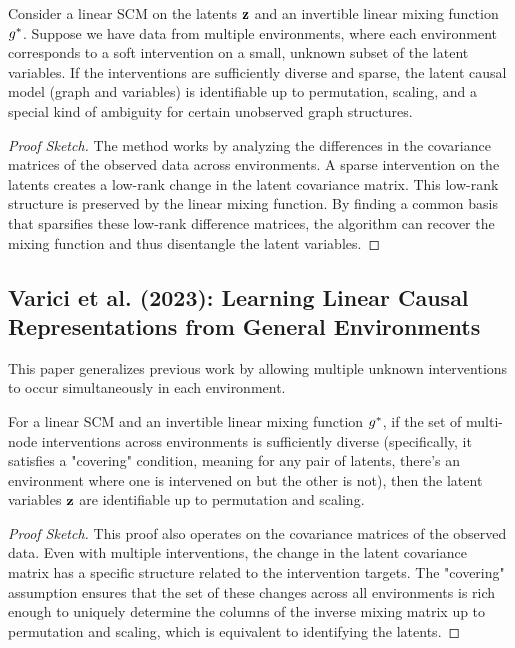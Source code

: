\documentclass{article}
\begin{document}
\begin{theorem}
Consider a linear SCM on the latents ${\mathbf{z}}$ and an invertible linear mixing function $g^*$. Suppose we have data from multiple environments, where each environment corresponds to a soft intervention on a small, unknown subset of the latent variables. If the interventions are sufficiently diverse and sparse, the latent causal model (graph and variables) is identifiable up to permutation, scaling, and a special kind of ambiguity for certain unobserved graph structures.
\end{theorem}
\begin{proof}[Proof Sketch]
The method works by analyzing the differences in the covariance matrices of the observed data across environments. A sparse intervention on the latents creates a low-rank change in the latent covariance matrix. This low-rank structure is preserved by the linear mixing function. By finding a common basis that sparsifies these low-rank difference matrices, the algorithm can recover the mixing function and thus disentangle the latent variables.
\end{proof}

\subsection{Varici et al. (2023): Learning Linear Causal Representations from General Environments}
This paper generalizes previous work by allowing multiple unknown interventions to occur simultaneously in each environment.

\begin{theorem}
For a linear SCM and an invertible linear mixing function $g^*$, if the set of multi-node interventions across environments is sufficiently diverse (specifically, it satisfies a "covering" condition, meaning for any pair of latents, there's an environment where one is intervened on but the other is not), then the latent variables ${\mathbf{z}}$ are identifiable up to permutation and scaling.
\end{theorem}
\begin{proof}[Proof Sketch]
This proof also operates on the covariance matrices of the observed data. Even with multiple interventions, the change in the latent covariance matrix has a specific structure related to the intervention targets. The "covering" assumption ensures that the set of these changes across all environments is rich enough to uniquely determine the columns of the inverse mixing matrix up to permutation and scaling, which is equivalent to identifying the latents.
\end{proof}
\end{document}
